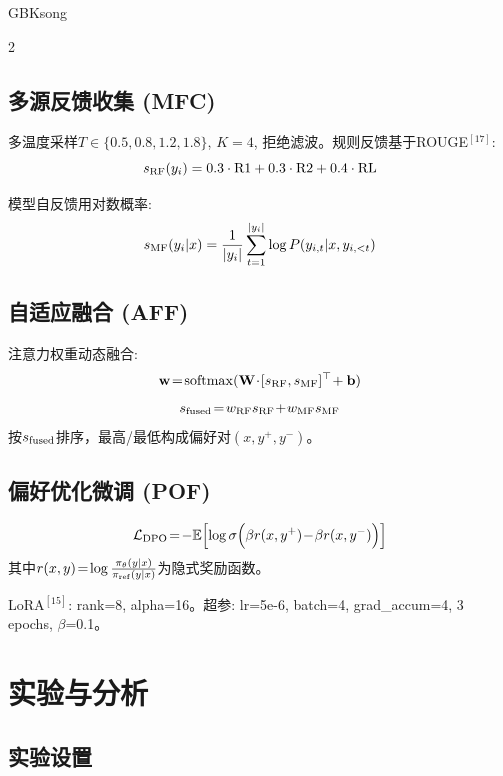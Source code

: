 \begin{CJK*}{GBK}{song}
\begin{multicols}{2}
\subsection{多源反馈收集 (MFC)}

多温度采样$T\in\{0.5,0.8,1.2,1.8\}$, $K=4$, 拒绝滤波。规则反馈基于ROUGE$^{[17]}$:
\begin{equation}
s_{\rm RF}(y_i)=0.3\cdot{\rm R1}+0.3\cdot{\rm R2}+0.4\cdot{\rm RL}
\end{equation}

模型自反馈用对数概率:
\begin{equation}
s_{\rm MF}(y_i|x)=\frac{1}{|y_i|}\sum_{t=1}^{|y_i|}\log P(y_{i,t}|x,y_{i,<t})
\end{equation}

\subsection{自适应融合 (AFF)}

注意力权重动态融合:
\begin{equation}
\mathbf{w}\!=\!{\mathrm{softmax}}(\mathbf{W}\!\cdot\![s_{\rm RF},s_{\rm MF}]^\top\!+\mathbf{b})
\end{equation}
\begin{equation}
s_{\rm fused}\!=\!w_{\rm RF}s_{\rm RF}\!+\!w_{\rm MF}s_{\rm MF}
\end{equation}
按$s_{\rm fused}$排序，最高/最低构成偏好对$(x, y^+, y^-)$。

\subsection{偏好优化微调 (POF)}

\begin{equation}
\mathcal{L}_{\rm DPO}\!=\!-\mathbb{E}\Bigl[\log\sigma\Bigl(\beta r(x,y^+)\!-\!\beta r(x,y^-)\Bigr)\Bigr]
\end{equation}
其中$r(x,y)\!=\!\log\frac{\pi_\theta(y|x)}{\pi_{\rm ref}(y|x)}$为隐式奖励函数。

LoRA$^{[15]}$: rank=8, alpha=16。超参: lr=5e-6, batch=4, grad\_accum=4, 3 epochs, $\beta$=0.1。

\section{实验与分析}

\subsection{实验设置}


\end{multicols}
\end{CJK*}
